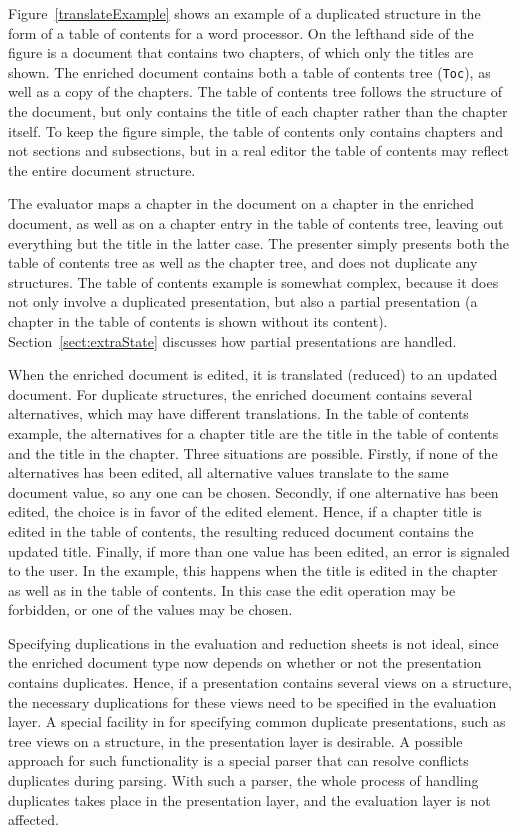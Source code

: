 Figure~\ref{translateExample} shows an example of a duplicated structure in the form of a table of contents for a word processor. On the lefthand side of the figure is a document that contains two chapters, of which only the titles are shown. The enriched document contains both a table of contents tree (\verb|Toc|), as well as a copy of the chapters. The table of contents tree follows the structure of the document, but only contains the title of each chapter rather than the chapter itself. To keep the figure simple, the table of contents only contains chapters and not sections and subsections, but in a real editor the table of contents may reflect the entire document structure. 

The evaluator maps a chapter in the document on a chapter in the enriched document, as well as on a chapter entry in the table of contents tree, leaving out everything but the title in the latter case. The presenter simply presents both the table of contents tree as well as the chapter tree, and does not duplicate any structures. The table of contents example is somewhat complex, because it does not only involve a duplicated presentation, but also a partial presentation (a chapter in the table of contents is shown without its content). Section~\ref{sect:extraState} discusses how partial presentations are handled.

When the enriched document is edited, it is translated (reduced) to an updated document. For duplicate structures, the enriched document contains several alternatives, which may have different translations. In the table of contents example, the alternatives for a chapter title are the title in the table of contents and the title in the chapter. Three situations are possible. Firstly, if none of the alternatives has been edited, all alternative values translate to the same document value, so any one can be chosen. Secondly, if one alternative has been edited, the choice is in favor of the edited element. Hence, if a chapter title is edited in the table of contents, the resulting reduced document contains the updated title. Finally, if more than one value has been edited, an error is signaled to the user. In the example, this happens when the title is edited in the chapter as well as in the table of contents. In this case the edit operation may be forbidden, or one of the values may be chosen.  

Specifying duplications in the evaluation and reduction sheets is not ideal, since the enriched document type now depends on whether or not the presentation contains duplicates. Hence, if a presentation contains several views on a structure, the necessary duplications for these views need to be specified in the evaluation layer. A special facility in for specifying common duplicate presentations, such as tree views on a structure, in the presentation layer is desirable. A possible approach for such functionality is a special parser that can resolve conflicts duplicates during parsing. With such a parser, the whole process of handling duplicates takes place in the presentation layer, and the evaluation layer is not affected. 

